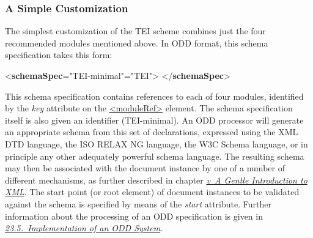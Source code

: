 \subsubsection[{A Simple Customization}]{A Simple Customization}\label{STINsimpleExample}\par
The simplest customization of the TEI scheme combines just the four recommended modules mentioned above. In ODD format, this schema specification takes this form: \par\bgroup{}\exampleFont \begin{shaded}\noindent\mbox{}{<\textbf{schemaSpec}\hspace*{1em}{ident}="{TEI-minimal}"\hspace*{1em}{start}="{TEI}">}\mbox{}\newline 
{}\mbox{}\newline 
{}\mbox{}\newline 
{}\mbox{}\newline 
{}\mbox{}\newline 
{</\textbf{schemaSpec}>}\end{shaded}\egroup\par \par
This schema specification contains references to each of four modules, identified by the {\itshape key} attribute on the \hyperref[TEI.moduleRef]{<moduleRef>} element. The schema specification itself is also given an identifier (\textsf{TEI-minimal}). An ODD processor will generate an appropriate schema from this set of declarations, expressed using the XML DTD language, the ISO RELAX NG language, the W3C Schema language, or in principle any other adequately powerful schema language. The resulting schema may then be associated with the document instance by one of a number of different mechanisms, as further described in chapter \textit{\hyperref[SG]{v\ A Gentle Introduction to XML}}. The start point (or root element) of document instances to be validated against the schema is specified by means of the {\itshape start} attribute. Further information about the processing of an ODD specification is given in \textit{\hyperref[IM]{23.5.\ Implementation of an ODD System}}.
